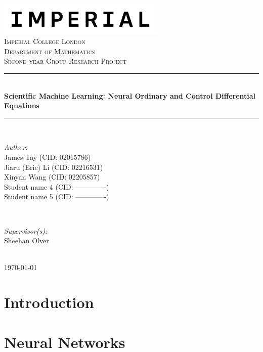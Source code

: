 \documentclass[a4paper,11pt, titlepage]{article}
\theoremstyle{definition}
\theoremstyle{plain}
\theoremstyle{remark}
\newcommand{\reporttitle}{Scientific Machine Learning: Neural Ordinary and Control Differential Equations}
\newcommand{\reportauthorA}{James Tay (CID: 02015786)}
\newcommand{\reportauthorB}{Jiaru (Eric) Li (CID: 02216531)}
\newcommand{\reportauthorC}{Xinyan Wang (CID: 02205857)}
\newcommand{\reportauthorD}{Student name 4 (CID: -------------)}
\newcommand{\reportauthorE}{Student name 5 (CID: -------------)}
\newcommand{\supervisor}{Sheehan Olver}
\begin{document}
\begin{titlepage}
\newcommand{\HRule}{\rule{\linewidth}{0.5mm}}
\includegraphics[width=8cm]{figures/Imperial_logo.png}\\[1cm]
\center
\textsc{\LARGE Imperial College London}\\[0.5cm] 
\textsc{\Large Department of Mathematics}\\[1.5cm] 
\textsc{\Large Second-year Group Research Project}\\[0.5cm]
\makeatletter
\HRule \\[0.6cm]
{\huge \bfseries \reporttitle}\\[0.6cm]
\HRule \\[1.5cm]
\begin{minipage}{0.4\textwidth}
\begin{flushleft} \large
\emph{Author:}\\
\reportauthorA \\
\reportauthorB \\
\reportauthorC \\
\reportauthorD \\
\reportauthorE
\end{flushleft}
\end{minipage}
~
\begin{minipage}{0.4\textwidth}
\begin{flushright} \large
\emph{Supervisor(s):} \\
\supervisor
\end{flushright}
\end{minipage}\\[2cm]
\makeatother
\vfill
\makeatletter
{\large \today}\\[2cm]
\makeatother
\end{titlepage}

\begin{abstract}

\end{abstract}

\tableofcontents

\section{Introduction}

\section{Neural Networks}
\end{document}
